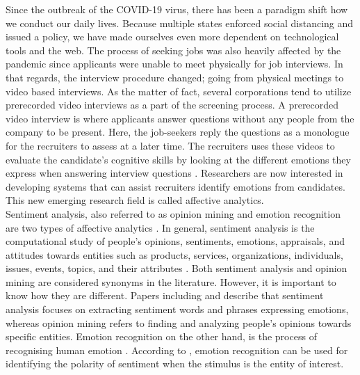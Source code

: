 Since the outbreak of the COVID-19 virus, there has been a paradigm shift how we conduct our daily lives. Because multiple states enforced social distancing and issued a  policy, we have made ourselves even more dependent on technological tools and the web. The process of seeking jobs was also heavily affected by the pandemic since applicants were unable to meet physically for job interviews. In that regards, the interview procedure changed; going from physical meetings to video based interviews. As the matter of fact, several corporations tend to utilize prerecorded video interviews as a part of the screening process. A prerecorded video interview is where applicants answer questions without any people from the company to be present. Here, the job-seekers reply the questions as a monologue for the recruiters to assess at a later time. The recruiters uses these videos to evaluate the candidate's cognitive skills by looking at the different emotions they express when answering interview questions \cite{JOSHI20201316}. Researchers are now interested in developing systems that can assist recruiters identify emotions from candidates. This new emerging research field is called affective analytics. \\

Sentiment analysis, also referred to as opinion mining and emotion recognition are two types of affective analytics \cite{MSA_review2_GANDHI2023424}. In general, sentiment analysis is the computational study of people’s opinions, sentiments, emotions, appraisals, and attitudes towards entities such as products, services, organizations, individuals, issues, events, topics, and their attributes \cite{SA-definition} \cite{HP-integration-project}. Both sentiment analysis and opinion mining are considered synonyms in the literature. However, it is important to know how they are different. Papers including \cite{SA-history-MANTYLA201816} and \cite{Student-feedback-MOOCS-app11093986} describe that sentiment analysis focuses on extracting sentiment words and phrases expressing emotions, whereas opinion mining refers to finding and analyzing people's opinions towards specific entities. Emotion recognition on the other hand, is the process of recognising human emotion \cite{MSA_review2_GANDHI2023424}. According to \cite{sentiment_emotion_difference_munezero2014they}, emotion recognition can be used for identifying the polarity of sentiment when the stimulus is the entity of interest. \\ 

